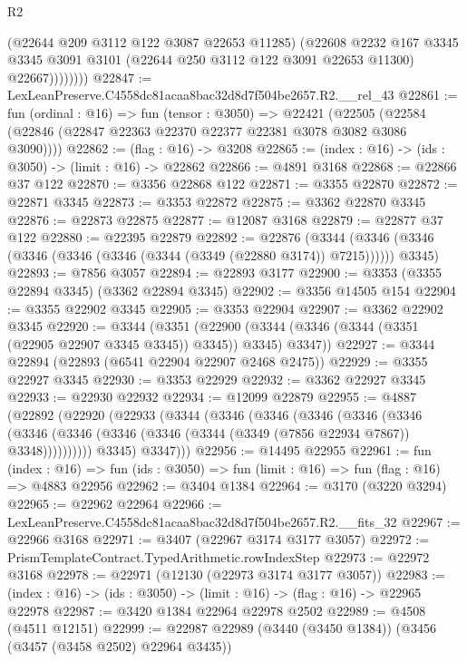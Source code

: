 \begin{lexlean}{R2}
\begin{coremodule}
                  (@22644 @209 @3112 @122 @3087 @22653 @11285)
                  (@22608
                    @2232
                    @167
                    @3345
                    @3345
                    @3091
                    @3101
                    (@22644 @250 @3112 @122 @3091 @22653 @11300)
                    @22667))))))))
@22847 := LexLeanPreserve.C4558dc81acaa8bac32d8d7f504be2657.R2.__rel_43
@22861 := fun (ordinal : @16) =>
  fun (tensor : @3050) =>
  @22421 (@22505 (@22584 (@22846 (@22847 @22363 @22370 @22377 @22381 @3078 @3082 @3086 @3090))))
@22862 := (flag : @16) -> @3208
@22865 := (index : @16) -> (ids : @3050) -> (limit : @16) -> @22862
@22866 := @4891 @3168
@22868 := @22866 @37 @122
@22870 := @3356 @22868 @122
@22871 := @3355 @22870
@22872 := @22871 @3345
@22873 := @3353 @22872
@22875 := @3362 @22870 @3345
@22876 := @22873 @22875
@22877 := @12087 @3168
@22879 := @22877 @37 @122
@22880 := @22395 @22879
@22892 := @22876
    (@3344 (@3346 (@3346 (@3346 (@3346 (@3346 (@3344 (@3349 (@22880 @3174)) @7215)))))) @3345)
@22893 := @7856 @3057
@22894 := @22893 @3177
@22900 := @3353 (@3355 @22894 @3345) (@3362 @22894 @3345)
@22902 := @3356 @14505 @154
@22904 := @3355 @22902 @3345
@22905 := @3353 @22904
@22907 := @3362 @22902 @3345
@22920 := @3344
    (@3351 (@22900 (@3344 (@3346 (@3344 (@3351 (@22905 @22907 @3345 @3345)) @3345)) @3345) @3347))
@22927 := @3344 @22894 (@22893 (@6541 @22904 @22907 @2468 @2475))
@22929 := @3355 @22927 @3345
@22930 := @3353 @22929
@22932 := @3362 @22927 @3345
@22933 := @22930 @22932
@22934 := @12099 @22879
@22955 := @4887
    (@22892
      (@22920
        (@22933
          (@3344
            (@3346
              (@3346
                (@3346
                  (@3346
                    (@3346
                      (@3346
                        (@3346 (@3346 (@3346 (@3344 (@3349 (@7856 @22934 @7867)) @3348))))))))))
            @3345)
          @3347)))
@22956 := @14495 @22955
@22961 := fun (index : @16) =>
  fun (ids : @3050) => fun (limit : @16) => fun (flag : @16) => @4883 @22956
@22962 := @3404 @1384
@22964 := @3170 (@3220 @3294)
@22965 := @22962 @22964
@22966 := LexLeanPreserve.C4558dc81acaa8bac32d8d7f504be2657.R2.__fits_32
@22967 := @22966 @3168
@22971 := @3407 (@22967 @3174 @3177 @3057)
@22972 := PrismTemplateContract.TypedArithmetic.rowIndexStep
@22973 := @22972 @3168
@22978 := @22971 (@12130 (@22973 @3174 @3177 @3057))
@22983 := (index : @16) -> (ids : @3050) -> (limit : @16) -> (flag : @16) -> @22965 @22978
@22987 := @3420 @1384 @22964 @22978 @2502
@22989 := @4508 (@4511 @12151)
@22999 := @22987 @22989 (@3440 (@3450 @1384)) (@3456 (@3457 (@3458 @2502) @22964 @3435))

\end{coremodule}
\end{lexlean}
